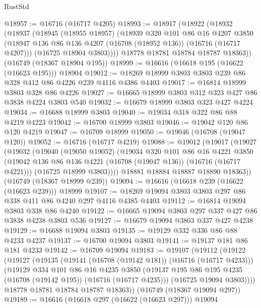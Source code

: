 \begin{lexlean}{RustStd}
\begin{coremodule}
@18957 := @16716 (@16717 @4205)
@18993 := @18917
    (@18922
      (@18932
        (@18937
          (@18945
            (@18955 @18957)
            (@18939
              @320
              @101
              @86
              @16
              @4207
              @3850
              (@18947 @136 @86 @136 @4207 (@16708 (@18952 @136)) (@16716 (@16717 @4207)))
              (@16725 @18904 @3803))))
        @18778
        @18781
        @18784
        @18787
        @18363))
    (@16749 (@18367 @18904 @195))
@18999 := @16616 (@16618 @195 (@16622 (@16623 @195))) @18904
@19012 := @18269 @18999 @3803 @3803 @239 @86 @328 @412 @86 @4226 @239 @4116 @4386 @4403
@19017 := @16814 @18999 @3803 @328 @86 @4226
@19027 := @16665 @18999 @3803 @312 @323 @427 @86 @3838 @4224 @3803 @540
@19032 := @16679 @18999 @3803 @323 @427 @4224
@19034 := @16688 @18999 @3803
@19040 := @19034 @318 @322 @86 @88 @4219 @4223
@19042 := @16700 @18999 @3803
@19046 := @19042 @120 @86 @120 @4219
@19047 := @16709 @18999
@19050 := @19046 (@16708 (@19047 @120))
@19052 := @16716 (@16717 @4219)
@19088 := @19012
    (@19017
      (@19027
        (@19032
          (@19040
            (@19050 @19052)
            (@19034
              @320
              @101
              @86
              @16
              @4221
              @3850
              (@19042 @136 @86 @136 @4221 (@16708 (@19047 @136)) (@16716 (@16717 @4221)))
              (@16725 @18999 @3803))))
        @18881
        @18884
        @18887
        @18890
        @18363))
    (@16749 (@18367 @18999 @239))
@19094 := @16616 (@16618 @239 (@16622 (@16623 @239))) @18999
@19107 := @18269 @19094 @3803 @3803 @297 @86 @338 @411 @86 @4240 @297 @4116 @4385 @4403
@19112 := @16814 @19094 @3803 @338 @86 @4240
@19122 := @16665 @19094 @3803 @297 @337 @427 @86 @3838 @4238 @3803 @536
@19127 := @16679 @19094 @3803 @337 @427 @4238
@19129 := @16688 @19094 @3803
@19135 := @19129 @332 @336 @86 @88 @4233 @4237
@19137 := @16700 @19094 @3803
@19141 := @19137 @181 @86 @181 @4233
@19142 := @16709 @19094
@19183 := @19107
    (@19112
      (@19122
        (@19127
          (@19135
            (@19141 (@16708 (@19142 @181)) (@16716 (@16717 @4233)))
            (@19129
              @334
              @101
              @86
              @16
              @4235
              @3850
              (@19137 @195 @86 @195 @4235 (@16708 (@19142 @195)) (@16716 (@16717 @4235)))
              (@16725 @19094 @3803))))
        @18778
        @18781
        @18784
        @18787
        @18363))
    (@16749 (@18367 @19094 @297))
@19189 := @16616 (@16618 @297 (@16622 (@16623 @297))) @19094

\end{coremodule}
\end{lexlean}
